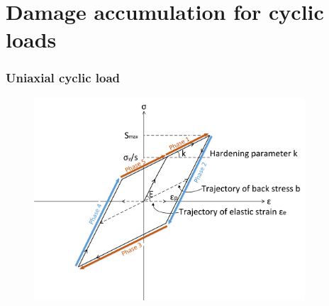 \documentclass[xcolor=table]{Bredelebeamer}
\begin{document}
\section{Damage accumulation for cyclic loads}
\begin{frame}
	\frametitle{Uniaxial cyclic load}	
	\begin{figure}[h!]
		\centering
		\includegraphics[width=0.9\textwidth]{figures//backstress.png} 
		\label{backstress}
	\end{figure}
\end{frame}	

\end{document}
